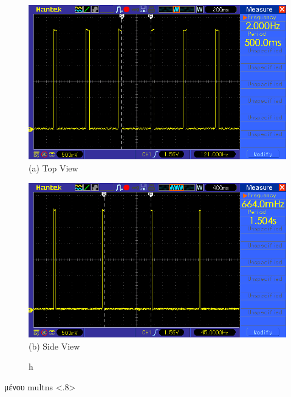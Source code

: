 \begin{figure} [H]
	\centering
    \begin{minipage}{.5\textwidth}
      \centering
      \includegraphics[width=0.9\linewidth]{../Images/Experiments-Results/node-pulses-0_5sec.png}\\
      {(a) Top View}
    \end{minipage}%
    \begin{minipage}{.5\textwidth}
      \centering
      \includegraphics[width=.9\linewidth]{../Images/Experiments-Results/node_pulses_1_5sec.png}\\
      {(b) Side View}
	  \end{minipage}
    \hfill \break
    \decoRule
    \caption[Εκτίμηση θέσης του αντικειμένου.]{h}%
    \label{fig:mulons}
\end{figure}


{μένου}%
{multns}%
<.8>




